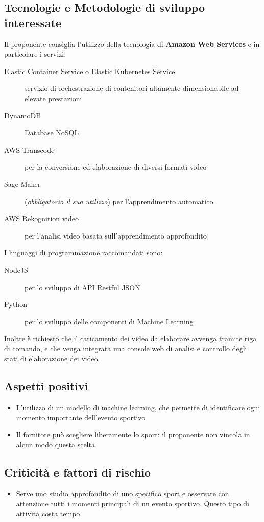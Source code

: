 \documentclass[../studio-di-fattibilita.tex]{subfiles}
\begin{document}
	\subsection{Tecnologie e Metodologie di sviluppo interessate}
	\label{subsec:tecnologie_interessate}
	Il proponente consiglia l'utilizzo della tecnologia di \textbf{Amazon Web Services} e in particolare i servizi:
	\begin{description}
		\item[Elastic Container Service o Elastic Kubernetes Service] servizio di orchestrazione di contenitori altamente dimensionabile ad elevate prestazioni
		\item[DynamoDB] Database NoSQL
		\item[AWS Transcode] per la conversione ed elaborazione di diversi formati video
		\item[Sage Maker](\textit{obbligatorio il suo utilizzo}) per l'apprendimento automatico
		\item[AWS Rekognition video] per l'analisi video basata sull'apprendimento approfondito
	\end{description}
	I linguaggi di programmazione raccomandati sono:
	\begin{description}
		\item[NodeJS] per lo sviluppo di API Restful JSON
		\item[Python] per lo sviluppo delle componenti di Machine Learning
	\end{description}
	Inoltre è richiesto che il caricamento dei video da elaborare avvenga tramite riga di comando, e che venga integrata una console web di analisi e controllo degli stati di elaborazione dei video.
	\subsection{Aspetti positivi}
	\label{subsec:aspetti_positivi}
	\begin{itemize}
		\item L'utilizzo di un modello di machine learning, che permette di identificare ogni momento importante dell’evento sportivo
		\item Il fornitore può scegliere liberamente lo sport: il proponente non vincola in alcun modo questa scelta
	\end{itemize}
	\subsection{Criticità e fattori di rischio}
	\label{sec:criticità_e_fattori_di_rischio}
	\begin{itemize}
		\item Serve uno studio approfondito di uno specifico sport e osservare con attenzione tutti i momenti principali di un evento sportivo. Questo tipo di attività costa tempo.
	\end{itemize}
\end{document}
